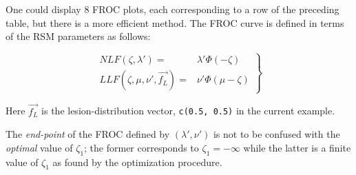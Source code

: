 \documentclass[
]{book}
\begin{document}
\begin{table}[H]

\caption{\label{tab:optim-op-point-table1}Summary of optimization results for $\mu = 2$, $\nu = 1$ and different values of $\lambda$. The wAFROC column always displays wAFROC-AUC, even though the optimized quantity may the Youden-index, as in the last four rows.}
\centering
{}
\end{table}

One could display 8 FROC plots, each corresponding to a row of the preceding table, but there is a more efficient method. The FROC curve is defined in terms of the RSM parameters as follows:

\begin{equation}
\left. 
\begin{aligned}
NLF \left ( \zeta, \lambda' \right ) =& \lambda' \Phi \left (-\zeta \right ) \\
LLF\left ( \zeta, \mu, \nu', \overrightarrow{f_L} \right ) =& \nu' \Phi \left ( \mu - \zeta \right ) 
\end{aligned}
\right \}
\label{eq:rsm-froc-predictions}
\end{equation}

Here \(\overrightarrow{f_L}\) is the lesion-distribution vector, \texttt{c(0.5,\ 0.5)} in the current example.

The \emph{end-point} of the FROC defined by \(\left ( \lambda', \nu' \right )\) is not to be confused with the \emph{optimal} value of \(\zeta_1\); the former corresponds to \(\zeta_1 = -\infty\) while the latter is a finite value of \(\zeta_1\) as found by the optimization procedure.
\end{document}
